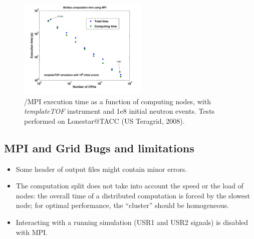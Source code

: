 \begin{figure}[htb!]
  \begin{center}
    \includegraphics[width=0.55\textwidth]{figures/mpi_efficiency}
  \end{center}
  \caption{\MCS/MPI execution time as a function of computing nodes, with
   \textit{templateTOF} instrument and 1e8 initial neutron events. Tests performed on
    Lonestar@TACC (US Teragrid, 2008).}
\label{fig:mpi_efficiency}
\end{figure}

\subsection{MPI and Grid Bugs and limitations}

\begin{itemize}
\item Some header of output files might contain minor errors.
\item The computation split does not take into account the speed or the
  load of nodes: the overall time of a distributed computation is
  forced by the slowest node; for optimal performance, the ``cluster''
  should be homogeneous.
\item Interacting with a running simulation (USR1 and USR2 signals) is disabled
  with MPI.
\end{itemize}

